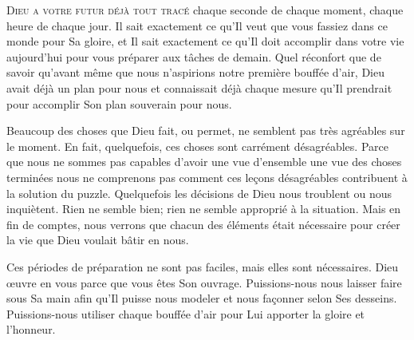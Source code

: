 

\lettrine{D}{ieu a votre futur déjà tout tracé}
 \ocadr chaque seconde de chaque moment, chaque heure de chaque jour.
 Il sait exactement ce qu'Il veut que vous fassiez dans ce monde
 pour Sa gloire, et Il sait exactement ce qu'Il doit accomplir
 dans votre vie aujourd'hui pour vous préparer aux tâches de demain.
 Quel réconfort que de savoir qu'avant même que nous n'aspirions
 notre première bouffée d'air, Dieu avait déjà un plan pour nous
 et connaissait déjà chaque mesure qu'Il prendrait pour accomplir
 Son plan souverain pour nous.


Beaucoup des choses que Dieu fait, ou permet, ne semblent pas très agréables
 sur le moment. En fait, quelquefois, ces choses sont carrément
 désagréables. Parce que nous ne sommes pas capables d'avoir une vue
 d'ensemble \ocadr une vue des choses terminées \fcadr{} nous ne comprenons
 pas comment ces leçons désagréables contribuent à la solution du puzzle.
 Quelquefois les décisions de Dieu nous troublent ou nous inquiètent.
 Rien ne semble bien; rien ne semble approprié à la situation.
 Mais en fin de comptes, nous verrons que chacun des éléments
 était nécessaire pour créer la vie que Dieu voulait bâtir en nous.

Ces périodes de préparation ne sont pas faciles,
 mais elles sont nécessaires. Dieu œuvre en vous parce que vous êtes
 Son ouvrage. Puissions-nous nous laisser faire sous Sa main
 afin qu'Il puisse nous modeler et nous façonner selon Ses desseins.
 Puissions-nous utiliser chaque bouffée d'air pour Lui apporter
 la gloire et l'honneur.

\dvrule






